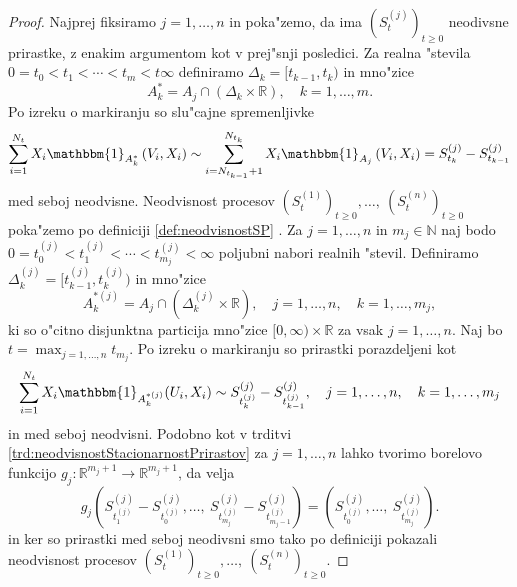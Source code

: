 \documentclass[12pt, a4paper, reqno]{amsart}
\theoremstyle{definition}
\theoremstyle{plain}
\newcommand{\R}{\mathbb{R}}
\newcommand{\N}{\mathbb{N}}
\newcommand{\1}{\mathds{1}}
\newcommand*{\refPriloga}[1]{%
  \begingroup
    \hypersetup{
      linkcolor=red,
      linkbordercolor=red,
    }%
    \ref{#1}%
  \endgroup
}
\begin{document}
        \begin{proof}
            Najprej fiksiramo $j=1, \dots, n$ in poka"zemo, da ima $(S_t^{(j)})_{t\geq0}$   neodivsne prirastke, z 
            enakim argumentom kot v prej"snji posledici. 
            Za realna "stevila $0 = t_0 < t_1 < \cdots < t_m < t \infty$ definiramo $\Delta_k = [t_{k-1}, t_k)$ in 
            mno"zice 
            \begin{equation*}
                A_k^* = A_j \cap \left(\Delta_k \times \R\right), \quad k = 1, \dots, m.
            \end{equation*}
            Po izreku o markiranju so slu"cajne spremenljivke 
            \begin{equation*}
                \sum_{i = 1}^{N_{t}}X_i\mathbbm{1}_{A_k^*}\left(V_i, X_i\right) \sim \sum_{i = N_{t_{k-1}}+1}^{N_{t_k}}X_i\mathbbm{1}_{A_j}\left(V_i, X_i\right) = S_{t_k}^{(j)} - S_{t_{k-1}}^{(j)}
            \end{equation*}
            med seboj neodvisne.
            Neodvisnost procesov $(S_t^{(1)})_{t\geq0}, \dots, \ (S_t^{(n)})_{t\geq0}$ poka"zemo po definiciji
            \refPriloga{def:neodvisnostSP}. Za $j=1, \dots, n$ in $m_j\in\N$ naj bodo $0 = t_0^{(j)} < t_1^{(j)} < \cdots < t^{(j)}_{m_j} < \infty$ 
            poljubni nabori realnih "stevil. Definiramo $\Delta^{(j)}_k = [t^{(j)}_{k-1}, t^{(j)}_k)$ in mno"zice
            \begin{equation*}
                A_k^{*(j)} = A_j \cap \left(\Delta_k^{(j)} \times \R\right), \quad j = 1, \dots, n, \quad k = 1, \dots, m_j,
            \end{equation*}
            ki so o"citno disjunktna particija mno"zice $[0, \infty)\times \R$ za vsak
            $j = 1, \dots, n$. Naj bo $t = \max_{j = 1, \dots, n}t_{m_j}$. Po izreku o markiranju 
            so prirastki porazdeljeni kot
            \begin{equation*}
                \sum_{i = 1}^{N_t} X_i\mathbbm{1}_{A_k^{*(j)}}(U_i, X_i) \sim 
                S_{t_k^{(j)}}^{(j)} - S_{t_{k-1}^{(j)}}^{(j)}, \quad j = 1, \dots, n, \quad k = 1, \dots, m_j
            \end{equation*}
            in med seboj neodvisni. Podobno kot v trditvi \ref{trd:neodvisnostStacionarnostPrirastov} za 
            $j=1, \dots, n$ lahko tvorimo 
            borelovo funkcijo $g_j:\R^{m_j + 1}\to\R^{m_j + 1}$, da velja 
            \begin{equation*}
                g_j\left(S_{t_1^{(j)}}^{(j)} - S_{t_0^{(j)}}^{(j)}, \dots, \ S_{t_{m_j}^{(j)}}^{(j)} - S_{t_{m_j - 1}^{(j)}}^{(j)}\right) = 
                \left(S_{t_0^{(j)}}^{(j)}, \dots, \ S_{t_{m_j}^{(j)}}^{(j)}\right).
            \end{equation*}
            in ker so prirastki med seboj neodivsni smo tako 
            po definiciji pokazali neodvisnost 
            procesov $(S_t^{(1)})_{t\geq0}, \dots, \ (S_t^{(n)})_{t\geq0}$.
        \end{proof}
    
\end{document}
